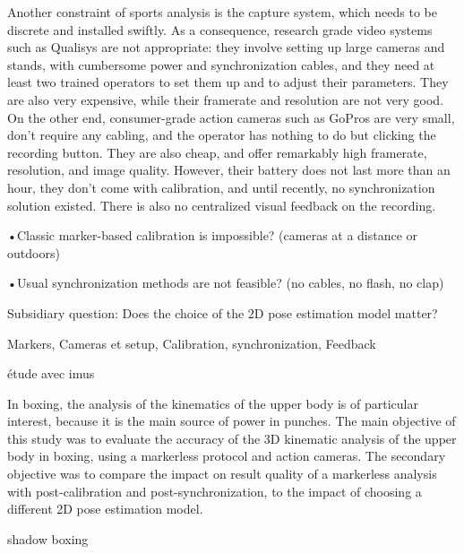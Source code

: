 Another constraint of sports analysis is the capture system, which needs to be discrete and installed swiftly. As a consequence, research grade video systems such as Qualisys are not appropriate: they involve setting up large cameras and stands, with cumbersome power and synchronization cables, and they need at least two trained operators to set them up and to adjust their parameters. They are also very expensive, while their framerate and resolution are not very good. On the other end, consumer-grade action cameras such as GoPros are very small, don't require any cabling, and the operator has nothing to do but clicking the recording button. They are also cheap, and offer remarkably high framerate, resolution, and image quality. However, their battery does not last more than an hour, they don't come with calibration, and until recently, no synchronization solution existed. There is also no centralized visual feedback on the recording.





•Classic marker-based calibration is impossible? (cameras at a distance or outdoors)

•Usual synchronization methods are not feasible? (no cables, no flash, no clap)

Subsidiary question: Does the choice of the 2D pose estimation model matter?



Markers, Cameras et setup, Calibration, synchronization, Feedback


étude avec imus \cite{Haralabidis2020}


In boxing, the analysis of the kinematics of the upper body is of particular interest, because it is the main source of power in punches. The main objective of this study was to evaluate the accuracy of the 3D kinematic analysis of the upper body in boxing, using a markerless protocol and action cameras. The secondary objective was to compare the impact on result quality of a markerless analysis with post-calibration and post-synchronization, to the impact of choosing a different 2D pose estimation model.



shadow boxing



